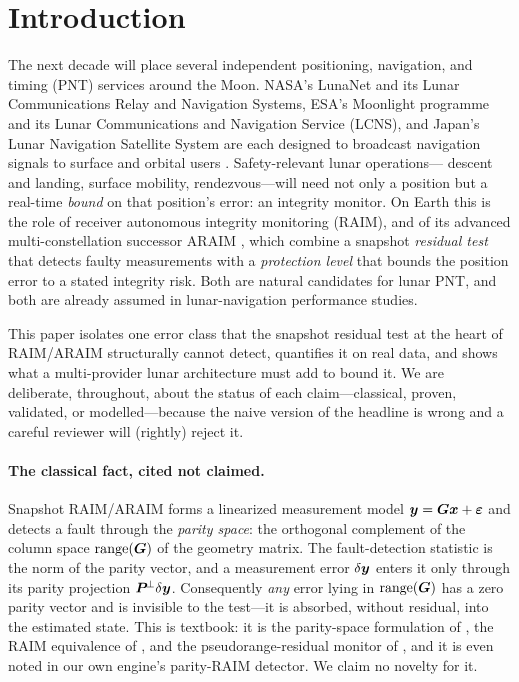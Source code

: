 \section{Introduction}
\label{sec:intro}

The next decade will place several independent positioning, navigation, and timing
(PNT) services around the Moon. NASA's LunaNet and its Lunar Communications Relay and
Navigation Systems, ESA's Moonlight programme and its Lunar Communications and
Navigation Service (LCNS), and Japan's Lunar Navigation Satellite System are each
designed to broadcast navigation signals to surface and orbital users
\citep{israel2020lunanet,fienga2024moonlight}. Safety-relevant lunar operations---%
descent and landing, surface mobility, rendezvous---will need not only a position but
a real-time \emph{bound} on that position's error: an integrity monitor. On Earth this
is the role of receiver autonomous integrity monitoring (RAIM), and of its advanced
multi-constellation successor ARAIM \citep{blanch2015,wgc2016araim}, which combine a
snapshot \emph{residual test} that detects faulty measurements with a
\emph{protection level} that bounds the position error to a stated integrity risk.
Both are natural candidates for lunar PNT, and both are already assumed in
lunar-navigation performance studies.

This paper isolates one error class that the snapshot residual test at the heart of
RAIM/ARAIM structurally cannot detect, quantifies it on real data, and shows what a
multi-provider lunar architecture must add to bound it. We are deliberate, throughout,
about the status of each claim---classical, proven, validated, or modelled---because
the naive version of the headline is wrong and a careful reviewer will (rightly)
reject it.

\paragraph{The classical fact, cited not claimed.}
Snapshot RAIM/ARAIM forms a linearized measurement model $\bm{y}=\bm{G}\bm{x}+\bm\varepsilon$
and detects a fault through the \emph{parity space}: the orthogonal complement of the
column space $\operatorname{range}(\bm{G})$ of the geometry matrix. The fault-detection statistic is the
norm of the parity vector, and a measurement error $\delta\bm{y}$ enters it only through
its parity projection $\bm{P}^{\!\perp}\delta\bm{y}$. Consequently \emph{any} error lying in
$\operatorname{range}(\bm{G})$ has a zero parity vector and is invisible to the test---it is absorbed,
without residual, into the estimated state. This is textbook: it is the parity-space
formulation of \citet{sturza1988}, the RAIM equivalence of \citet{brown1992}, and the
pseudorange-residual monitor of \citet{parkinson1988}, and it is even noted in our own
engine's parity-RAIM detector. We claim no novelty for it.

